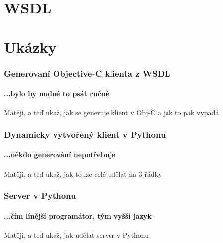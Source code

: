\documentclass[12pt]{beamer}
\begin{document}
\section{WSDL}

\section{Ukázky}

\begin{frame}
  \frametitle{Generovaní Objective-C klienta z WSDL}
  \framesubtitle{...bylo by nudné to psát ručně}

  \begin{example}
    Matěji, a teď ukaž, jak se generuje klient v Obj-C a jak to pak vypadá
  \end{example}
\end{frame}

\begin{frame}
  \frametitle{Dynamicky vytvořený klient v Pythonu}
  \framesubtitle{...někdo generování nepotřebuje}

  \begin{example}
    Matěji, a teď ukaž, jak to lze celé udělat na 3 řádky
  \end{example}
\end{frame}

\begin{frame}
  \frametitle{Server v Pythonu}
  \framesubtitle{...čím línější programátor, tým vyšší jazyk}

  \begin{example}
    Matěji, a teď ukaž, jak udělat server v Pythonu
  \end{example}
\end{frame}


\end{document}

